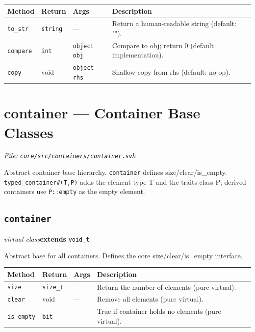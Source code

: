 \documentclass[11pt,letterpaper]{report}
\begin{document}
\begin{xltabular}{\linewidth}{>{\small}p{1.35in} >{\small}p{1.25in} >{\small}p{0.95in} >{\small}X}
\toprule
\textbf{Method} & \textbf{Return} & \textbf{Args} & \textbf{Description} \\
\midrule
\endhead
\bottomrule
\endfoot
\texttt{to\_str} & \texttt{string} & --- & Return a human-readable string (default: ""). \\
\texttt{compare} & \texttt{int} & \texttt{object obj} & Compare to obj; return 0 (default implementation). \\
\texttt{copy} & void & \texttt{object rhs} & Shallow-copy from rhs (default: no-op). \\
\end{xltabular}

\section{container --- Container Base Classes}
\noindent\small\textit{File: \texttt{core/src/containers/container.svh}}\par

Abstract container base hierarchy. \texttt{container} defines size/clear/is\_empty. \texttt{typed\_container\#(T,P)} adds the element type T and the traits class P; derived containers use \texttt{P::empty} as the empty element.

\subsection*{\texttt{container}}
\noindent\small\textit{virtual class}\quad \textbf{extends} \texttt{void\_t}\par

Abstract base for all containers. Defines the core size/clear/is\_empty interface.

\begin{xltabular}{\linewidth}{>{\small}p{1.35in} >{\small}p{1.25in} >{\small}p{0.95in} >{\small}X}
\toprule
\textbf{Method} & \textbf{Return} & \textbf{Args} & \textbf{Description} \\
\midrule
\endhead
\bottomrule
\endfoot
\texttt{size} & \texttt{size\_t} & --- & Return the number of elements (pure virtual). \\
\texttt{clear} & void & --- & Remove all elements (pure virtual). \\
\texttt{is\_empty} & \texttt{bit} & --- & True if container holds no elements (pure virtual). \\
\end{xltabular}
\end{document}

